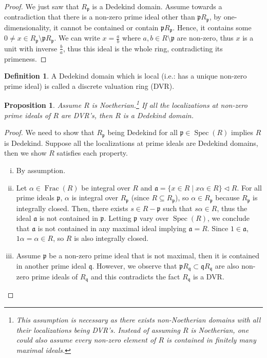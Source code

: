 \documentclass{tufte-handout} %
\newtheorem{prop}[thm]{Proposition}
\theoremstyle{definition}
\newtheorem{defn}[thm]{Definition}
\theoremstyle{remark}
\newcommand{\lp}{{\mathfrak{p}}}
\DeclareMathOperator{\ff}{Frac}
\DeclareMathOperator{\spec}{Spec}
\begin{document}
\begin{proof}
	We just saw that $R_{\lp}$ is a Dedekind domain. Assume towards a contradiction that there is a non-zero prime ideal other than $\lp R_{\lp}$, by one-dimensionality, it cannot be contained or contain $\lp R_{\lp}$. Hence, it contains some $0 \neq x \in R_{\lp} \setminus \lp R_{\lp}$. We can write $x = \frac{a}{b}$ where $a,b \in R \setminus \lp$ are non-zero, thus $x$ is a unit with inverse $\frac{b}{a}$, thus this ideal is the whole ring, contradicting its primeness.
\end{proof}
\begin{defn}
	A Dedekind domain which is local (i.e.: has a unique non-zero prime ideal) is called a discrete valuation ring (DVR).
\end{defn}
\begin{prop}
	Assume $R$ is Noetherian.\footnote{This assumption is necessary as there exists non-Noetherian domains with all their localizations being DVR's. Instead of assuming $R$ is Noetherian, one could also assume every non-zero element of $R$ is contained in finitely many maximal ideals.} If all the localizations at non-zero prime ideals of $R$ are DVR's, then $R$ is a Dedekind domain.
\end{prop}
\begin{proof}
	We need to show that $R_{\lp}$ being Dedekind for all $\lp \in \spec(R)$ implies $R$ is Dedekind. Suppose all the localizations at prime ideals are Dedekind domains, then we show $R$ satisfies each property.
	\begin{enumerate}[(i)]
		\item By assumption.
		\item Let $\alpha \in \ff(R)$ be integral over $R$ and $\mathfrak{a} = \{x \in R \mid x\alpha \in R\} \lhd R$. For all prime ideals $\lp$, $\alpha$ is integral over $R_{\lp}$ (since $R \subseteq R_{\lp}$), so $\alpha \in R_{\lp}$ because $R_{\lp}$ is integrally closed. Then, there exists $s \in R-\lp$ such that $s\alpha \in R$, thus the ideal $\mathfrak{a}$ is not contained in $\lp$. Letting $\lp$ vary over $\spec(R)$, we conclude that $\mathfrak{a}$ is not contained in any maximal ideal implying $\mathfrak{a} = R$. Since $1 \in\mathfrak{a}$, $1\alpha = \alpha \in R$, so $R$ is also integrally closed.
		\item Assume $\lp$ be a non-zero prime ideal that is not maximal, then it is contained in another prime ideal $\mathfrak{q}$. However, we observe that $\lp R_{\mathfrak{q}} \subset \mathfrak{q}R_{\mathfrak{q}}$ are also non-zero prime ideals of $R_{\mathfrak{q}}$ and this contradicts the fact $R_{\mathfrak{q}}$ is a DVR.
	\end{enumerate}
\end{proof}
\end{document}
